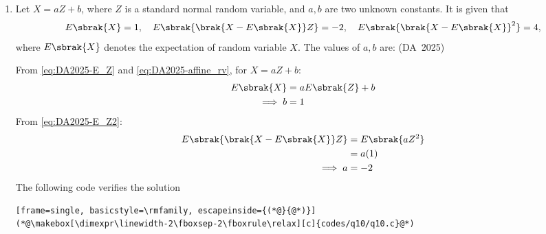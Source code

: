 \begin{enumerate}[label=\thesubsection.\arabic*, ref=\thesubsection.\theenumi]
	\item 
	Let $X = aZ + b$, where $Z$ is a standard normal random variable, and $a, b$ are two unknown constants. It is given that
	\begin{align}
		E\sbrak{X} = 1, \quad E\sbrak{\brak{X - E\sbrak{X}}Z} = -2, \quad E\sbrak{\brak{X - E\sbrak{X}}^2} = 4,
	\end{align}
	where $E\sbrak{X}$ denotes the expectation of random variable $X$. The values of $a, b$ are:
	\hfill (DA~2025)
	\begin{enumerate}
	\end{enumerate}
	\solution
	From \eqref{eq:DA2025-E_Z} and \eqref{eq:DA2025-affine_rv}, for $X = aZ + b$:
	\begin{align}
		E\sbrak{X} &= aE\sbrak{Z} + b
		\\
		\implies b &= 1
	\end{align}
	From \eqref{eq:DA2025-E_Z2}:
	\begin{align}
		E\sbrak{\brak{X - E\sbrak{X}}Z} &= E\sbrak{aZ^2}
		\\
		&= a(1)
		\\
		\implies a &= -2
	\end{align}
	The following code verifies the solution
	\begin{lstlisting}[frame=single, basicstyle=\rmfamily, escapeinside={(*@}{@*)}]
(*@\makebox[\dimexpr\linewidth-2\fboxsep-2\fboxrule\relax][c]{codes/q10/q10.c}@*)
	\end{lstlisting}
	

\end{enumerate}
